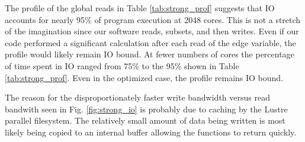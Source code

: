 The profile of the global reads in Table \ref{tab:strong_prof} suggests that
IO accounts for nearly 95\% of program execution at 2048 cores.  This is not a
stretch of the imagination since our software reads, subsets, and then writes.
Even if our code performed a significant calculation after each read of the
edge variable, the profile would likely remain IO bound.  At fewer numbers of
cores the percentage of time spent in IO ranged from 75\% to the 95\% shown in
Table \ref{tab:strong_prof}.  Even in the optimized case, the profile remains
IO bound.

The reason for the disproportionately faster write bandwidth versus read
bandwith seen in Fig. \ref{fig:strong_io} is probably due to caching by the
Lustre parallel filesystem.  The relatively small amount of data being written
is most likely being copied to an internal buffer allowing the functions to
return quickly.
